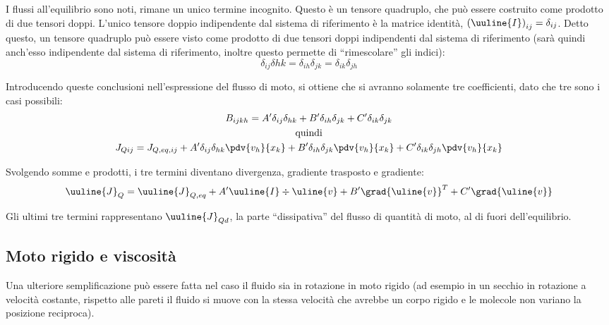 I flussi all'equilibrio sono noti, rimane un unico termine incognito.
Questo è un tensore quadruplo, che può essere costruito come prodotto di due tensori doppi.
L'unico tensore doppio indipendente dal sistema di riferimento è la matrice identità, ${(\uuline{I})}_{ij} = \delta_{ij}$.
Detto questo, un tensore quadruplo può essere visto come prodotto di due tensori doppi indipendenti dal sistema di riferimento (sarà quindi anch'esso indipendente dal sistema di riferimento, inoltre questo permette di ``rimescolare'' gli indici):
%
	\begin{equation*}
		\delta_{ij} \delta{hk} = \delta_{ih} \delta_{jk} = \delta_{ik} \delta_{jh}
	\end{equation*}
%

Introducendo queste conclusioni nell'espressione del flusso di moto, si ottiene che si avranno solamente tre coefficienti, dato che tre sono i casi possibili:
%
	\begin{equation*}
		\begin{gathered}
			B_{ijkh} = A' \delta_{ij} \delta_{hk} + B' \delta_{ih} \delta_{jk} + C' \delta_{ik} \delta_{jk} \\
			\text{quindi}\\
			J_{Qij} = J_{Q,eq,ij} + A' \delta_{ij} \delta_{hk} \pdv{v_h}{x_k} + B' \delta_{ih} \delta_{jk} \pdv{v_h}{x_k} + C' \delta_{ik} \delta_{jh} \pdv{v_h}{x_k}
		\end{gathered}
	\end{equation*}
%

Svolgendo somme e prodotti, i tre termini diventano divergenza, gradiente trasposto e gradiente:
%
	\begin{equation*}
		\uuline{J}_Q = \uuline{J}_{Q,eq} + A' \uuline{I} \div{\uline{v}} + B ' \grad{\uline{v}}^T + C' \grad{\uline{v}}
	\end{equation*}
%	

Gli ultimi tre termini rappresentano $\uuline{J}_{Qd}$, la parte ``dissipativa'' del flusso di quantità di moto, al di fuori dell'equilibrio.

\subsection{Moto rigido e viscosità}
Una ulteriore semplificazione può essere fatta nel caso il fluido sia in rotazione in moto rigido (ad esempio in un secchio in rotazione a velocità costante, rispetto alle pareti il fluido si muove con la stessa velocità che avrebbe un corpo rigido e le molecole non variano la posizione reciproca).


